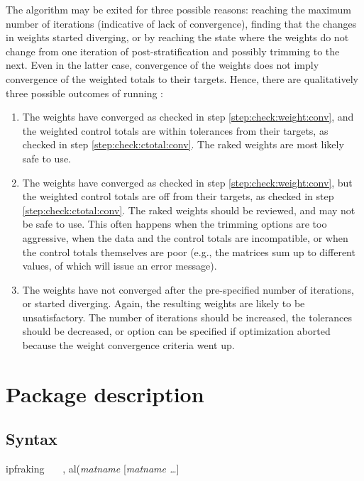 The algorithm may be exited for three possible reasons: reaching
the maximum number of iterations (indicative of lack of convergence),
finding that the changes in weights started diverging,
or by reaching the state where the weights do not change from one iteration
of post-stratification and possibly trimming to the next. Even in the latter
case, convergence of the weights does not imply convergence of the weighted
totals to their targets. Hence, there are qualitatively three possible
outcomes of running :
\begin{enumerate}
    \item The weights have converged as checked in step
         \ref{step:check:weight:conv}, and the weighted control totals
         are within tolerances from their targets, as checked in
         step \ref{step:check:ctotal:conv}. The raked weights
         are most likely safe to use.
    \item The weights have converged as checked in step
         \ref{step:check:weight:conv}, but the weighted control totals
         are off from their targets, as checked in
         step \ref{step:check:ctotal:conv}. The raked weights
         should be reviewed, and may not be safe to use.
         This often happens when the trimming options are
         too aggressive, when the data and the control totals
         are incompatible, or when the control totals themselves
         are poor (e.g., the matrices sum up to different values,
         of which  will issue an error message).
    \item The weights have not converged after the pre-specified number
        of iterations, or started diverging. Again, the resulting weights
        are likely to be unsatisfactory. The number of iterations should
        be increased, the tolerances should be decreased, or 
         option can be specified if optimization aborted
        because the weight convergence criteria went up.
\end{enumerate}

\section{Package description}

\subsection{Syntax}

\begin{stsyntax}
ipfraking
\optif\
\optin\
\optweight\
,
al({\it matname} [{\it matname \ldots}]
\end{stsyntax}

